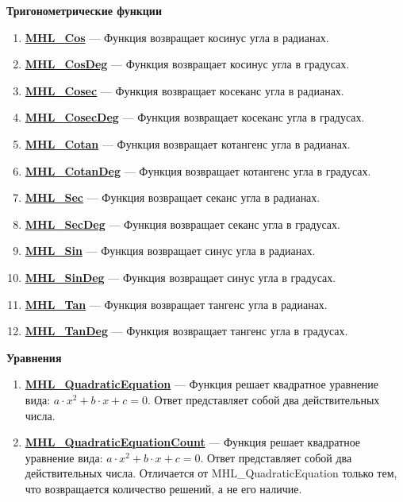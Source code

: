\documentclass[a4paper,12pt]{article}
\begin{document}
\textbf{Тригонометрические функции}
\begin{enumerate}

\item \textbf{\hyperref[MHL_Cos]{MHL\_Cos}} --- Функция возвращает косинус угла в радианах.

\item \textbf{\hyperref[MHL_CosDeg]{MHL\_CosDeg}} --- Функция возвращает косинус угла в градусах.

\item \textbf{\hyperref[MHL_Cosec]{MHL\_Cosec}} --- Функция возвращает косеканс угла в радианах.

\item \textbf{\hyperref[MHL_CosecDeg]{MHL\_CosecDeg}} --- Функция возвращает косеканс угла в градусах.

\item \textbf{\hyperref[MHL_Cotan]{MHL\_Cotan}} --- Функция возвращает котангенс угла в радианах.

\item \textbf{\hyperref[MHL_CotanDeg]{MHL\_CotanDeg}} --- Функция возвращает котангенс угла в градусах.

\item \textbf{\hyperref[MHL_Sec]{MHL\_Sec}} --- Функция возвращает секанс угла в радианах.

\item \textbf{\hyperref[MHL_SecDeg]{MHL\_SecDeg}} --- Функция возвращает секанс угла в градусах.

\item \textbf{\hyperref[MHL_Sin]{MHL\_Sin}} --- Функция возвращает синус угла в радианах.

\item \textbf{\hyperref[MHL_SinDeg]{MHL\_SinDeg}} --- Функция возвращает синус угла в градусах.

\item \textbf{\hyperref[MHL_Tan]{MHL\_Tan}} --- Функция возвращает тангенс угла в радианах.

\item \textbf{\hyperref[MHL_TanDeg]{MHL\_TanDeg}} --- Функция возвращает тангенс угла в градусах.

\end{enumerate}

\textbf{Уравнения}
\begin{enumerate}

\item \textbf{\hyperref[MHL_QuadraticEquation]{MHL\_QuadraticEquation}} --- Функция решает квадратное уравнение вида: $a\cdot x^2+b\cdot x+c=0$. Ответ представляет собой два действительных числа.

\item \textbf{\hyperref[MHL_QuadraticEquationCount]{MHL\_QuadraticEquationCount}} --- Функция решает квадратное уравнение вида: $a\cdot x^2+b\cdot x+c=0$. Ответ представляет собой два действительных числа. Отличается от MHL\_QuadraticEquation только тем, что возвращается количество решений, а не его наличие.

\end{enumerate}
\end{document}
